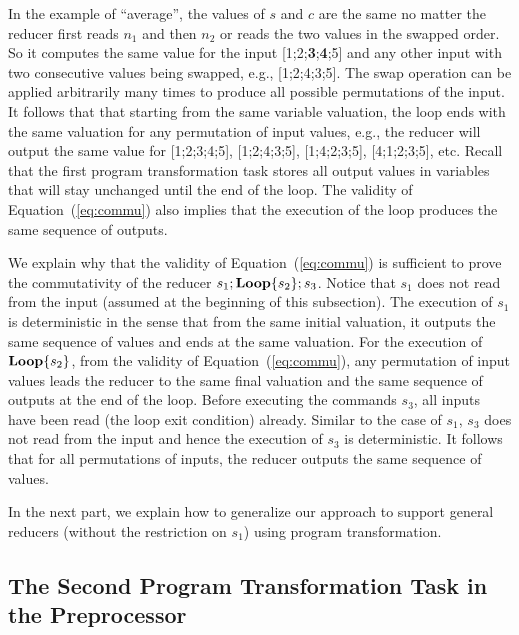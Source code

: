 \documentclass{llncs}
\newcommand{\rloop}{
	\ifmmode
	\mathbf{Loop}
	\else
	\textbf{Loop}
	\fi}
\begin{document}
In the example of ``average'', the values of $s$ and $c$ are the same no matter the reducer first reads $n_1$ and then $n_2$ or reads the two values in the swapped order.
So it computes the same value for the input [1;2;\textbf{3};\textbf{4};5] and any other input with two consecutive values being swapped, e.g., [1;2;4;3;5].
The swap operation can be applied arbitrarily many times to produce all possible permutations of the input.
It follows that that starting from the same variable valuation, the loop ends with the same valuation for any permutation of input values, e.g., the reducer will output the same value for [1;2;3;4;5], [1;2;4;3;5], [1;4;2;3;5], [4;1;2;3;5], etc.
Recall that the first program transformation task stores all output values in variables that will stay unchanged until the end of the loop. The validity of Equation~(\ref{eq:commu}) also implies that the execution of the loop produces the same sequence of outputs.

We explain why that the validity of Equation~(\ref{eq:commu}) is sufficient to prove the commutativity of the reducer $s_1;\rloop\{s_2\};s_3$. Notice that $s_1$ does not read from the input (assumed at the beginning of this subsection). The execution of $s_1$ is deterministic in the sense that from the same initial valuation, it outputs the same sequence of values and ends at the same valuation. For the execution of $\rloop\{s_2\}$, from the validity of Equation~(\ref{eq:commu}), any permutation of input values leads the reducer to the same final valuation and the same sequence of outputs at the end of the loop.
Before executing the commands $s_3$, all inputs have been read (the loop exit condition) already. Similar to the case of $s_1$, $s_3$ does not read from the input and hence the execution of $s_3$ is deterministic. It follows that for all permutations of inputs, the reducer outputs the same sequence of values.

In the next part, we explain how to generalize our approach to support general reducers (without the restriction on $s_1$) using program transformation.

\subsection{The Second Program Transformation Task in the Preprocessor}
\label{sec:program_trans2}
\end{document}
